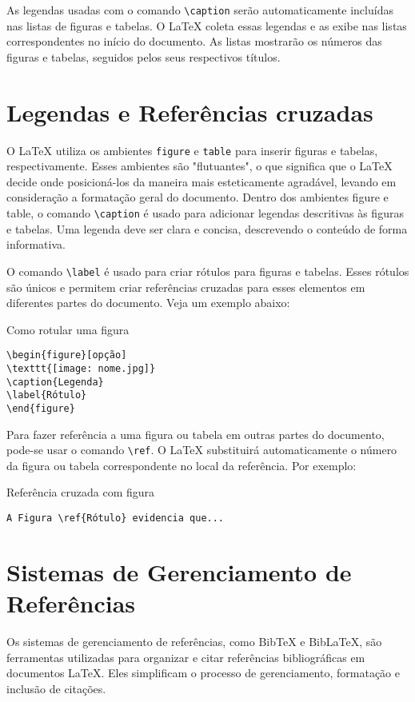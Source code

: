 \noindent As legendas usadas com o comando \verb|\caption| serão automaticamente incluídas nas listas de figuras e tabelas. O \LaTeX{} coleta essas legendas e as exibe nas listas correspondentes no início do documento. As listas mostrarão os números das figuras e tabelas, seguidos pelos seus respectivos títulos.

\section{Legendas e Referências cruzadas}
\label{sec:4}

O \LaTeX{} utiliza os ambientes \verb|figure| e \verb|table| para inserir figuras e tabelas, respectivamente. Esses ambientes são "flutuantes", o que significa que o \LaTeX{} decide onde posicioná-los da maneira mais esteticamente agradável, levando em consideração a formatação geral do documento. Dentro dos ambientes figure e table, o comando \verb|\caption| é usado para adicionar legendas descritivas às figuras e tabelas. Uma legenda deve ser clara e concisa, descrevendo o conteúdo de forma informativa. 

\noindent O comando \verb|\label| é usado para criar rótulos para figuras e tabelas. Esses rótulos são únicos e permitem criar referências cruzadas para esses elementos em diferentes partes do documento. Veja um exemplo abaixo:

\begin{trailer}{Como rotular uma figura}
\begin{verbatim} 
\begin{figure}[opção]
\texttt{[image: nome.jpg]}
\caption{Legenda}
\label{Rótulo}
\end{figure}
\end{verbatim}
\end{trailer}

\noindent Para fazer referência a uma figura ou tabela em outras partes do documento, pode-se usar o comando \verb|\ref|. O \LaTeX{} substituirá automaticamente o número da figura ou tabela correspondente no local da referência. Por exemplo:

\begin{trailer}{Referência cruzada com figura}
\begin{verbatim} 
A Figura \ref{Rótulo} evidencia que...
\end{verbatim}
\end{trailer}

\section{Sistemas de Gerenciamento de Referências}
Os sistemas de gerenciamento de referências, como BibTeX e BibLaTeX, são ferramentas utilizadas para organizar e citar referências bibliográficas em documentos \LaTeX{}. Eles simplificam o processo de gerenciamento, formatação e inclusão de citações. 

